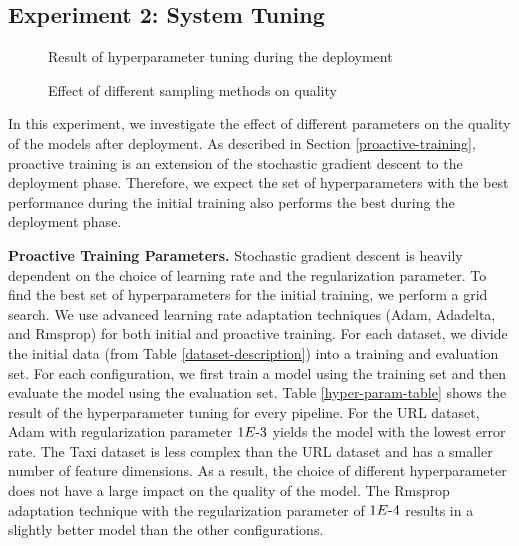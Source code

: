 \subsection{Experiment 2: System Tuning}
\begin{figure}[!h]
\centering
\resizebox{\columnwidth}{!}{}
 \vspace{-15pt}
\caption{Result of hyperparameter tuning during the deployment}
 \vspace{-10pt}
\label{hyper-param-figure}
\end{figure}
\begin{figure}[!h]
\centering
\resizebox{\columnwidth}{!}{}
 \vspace{-10pt}
\caption{Effect of different sampling methods on quality}
 \vspace{-10pt}
\label{sampling-method-figure}
\end{figure}
In this experiment, we investigate the effect of different parameters on the quality of the models after deployment.
As described in Section \ref{proactive-training}, proactive training is an extension of the stochastic gradient descent to the deployment phase.
Therefore, we expect the set of hyperparameters with the best performance during the initial training also performs the best during the deployment phase.

\textbf{Proactive Training Parameters. }
Stochastic gradient descent is heavily dependent on the choice of learning rate and the regularization parameter.
To find the best set of hyperparameters for the initial training, we perform a grid search.
We use advanced learning rate adaptation techniques (Adam, Adadelta, and Rmsprop) for both initial and proactive training.
For each dataset, we divide the initial data (from Table \ref{dataset-description}) into a training and evaluation set.
For each configuration, we first train a model using the training set and then evaluate the model using the evaluation set.
Table \ref{hyper-param-table} shows the result of the hyperparameter tuning for every pipeline.
For the URL dataset, Adam with regularization parameter $1E{\text -}3$ yields the model with the lowest error rate.
The Taxi dataset is less complex than the URL dataset and has a smaller number of feature dimensions.
As a result, the choice of different hyperparameter does not have a large impact on the quality of the model.
The Rmsprop adaptation technique with the regularization parameter of $1E{\text -}4$ results in a slightly better model than the other configurations.


